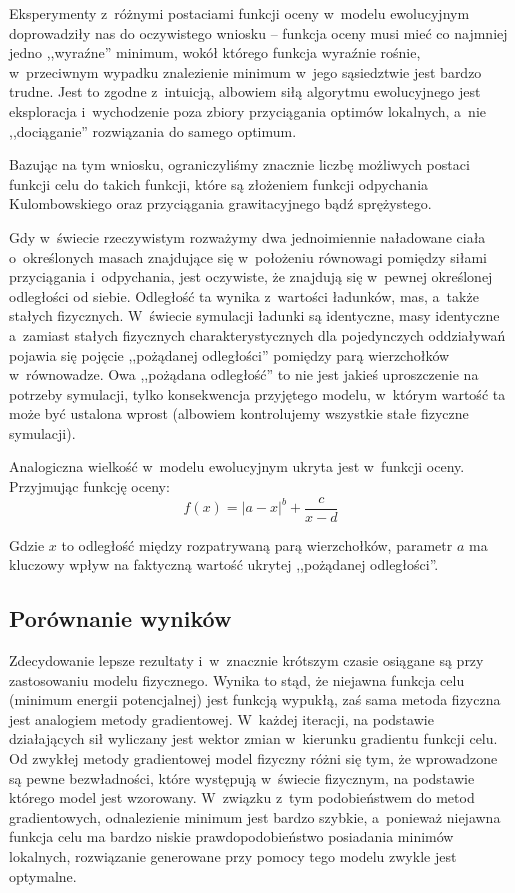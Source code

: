 \documentclass[a4paper,onecolumn,oneside,12pt]{mwart}
\begin{document}
Eksperymenty z~różnymi postaciami funkcji oceny w~modelu ewolucyjnym
doprowadziły nas do oczywistego wniosku -- funkcja oceny musi mieć co
najmniej jedno ,,wyraźne'' minimum, wokół którego funkcja wyraźnie rośnie,
w~przeciwnym wypadku znalezienie minimum w~jego sąsiedztwie jest bardzo
trudne. Jest to zgodne z~intuicją, albowiem siłą algorytmu ewolucyjnego
jest eksploracja i~wychodzenie poza zbiory przyciągania optimów lokalnych,
a~nie ,,dociąganie'' rozwiązania do samego optimum.

Bazując na tym wniosku, ograniczyliśmy znacznie liczbę możliwych postaci
funkcji celu do takich funkcji, które są złożeniem funkcji odpychania
Kulombowskiego oraz przyciągania grawitacyjnego bądź sprężystego.

Gdy w~świecie rzeczywistym rozważymy dwa jednoimiennie naładowane ciała
o~określonych masach znajdujące się w~położeniu równowagi pomiędzy siłami
przyciągania i~odpychania, jest oczywiste, że znajdują się w~pewnej
określonej odległości od siebie. Odległość ta wynika z~wartości ładunków,
mas, a~także stałych fizycznych. W~świecie symulacji ładunki są identyczne,
masy identyczne a~zamiast stałych fizycznych charakterystycznych dla
pojedynczych oddziaływań pojawia się pojęcie ,,pożądanej odległości''
pomiędzy parą wierzchołków w~równowadze. Owa ,,pożądana odległość'' to nie
jest jakieś uproszczenie na potrzeby symulacji, tylko konsekwencja
przyjętego modelu, w~którym wartość ta może być ustalona wprost (albowiem
kontrolujemy wszystkie stałe fizyczne symulacji).

Analogiczna wielkość w~modelu ewolucyjnym ukryta jest w~funkcji oceny.
Przyjmując funkcję oceny:
\begin{displaymath}
	f(x) = |a - x|^b + \frac{c}{x - d}
\end{displaymath}

Gdzie $x$ to odległość między rozpatrywaną parą wierzchołków, parametr $a$
ma kluczowy wpływ na faktyczną wartość ukrytej ,,pożądanej odległości''.

\subsection{Porównanie wyników}

Zdecydowanie lepsze rezultaty i~w~znacznie krótszym czasie osiągane są przy
zastosowaniu modelu fizycznego. Wynika to stąd, że niejawna funkcja celu
(minimum energii potencjalnej) jest funkcją wypukłą, zaś sama metoda
fizyczna jest analogiem metody gradientowej. W~każdej iteracji, na podstawie
działających sił wyliczany jest wektor zmian w~kierunku gradientu funkcji
celu. Od zwykłej metody gradientowej model fizyczny różni się tym, że
wprowadzone są pewne bezwładności, które występują w~świecie fizycznym, na
podstawie którego model jest wzorowany. W~związku z~tym podobieństwem do
metod gradientowych, odnalezienie minimum jest bardzo szybkie, a~ponieważ
niejawna funkcja celu ma bardzo niskie prawdopodobieństwo posiadania
minimów lokalnych, rozwiązanie generowane przy pomocy tego modelu zwykle
jest optymalne.
\end{document}
